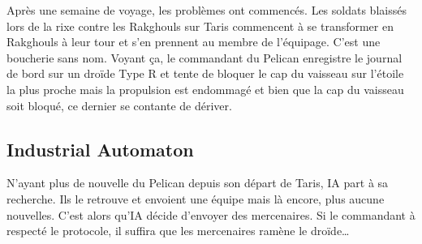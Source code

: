Après une semaine de voyage, les problèmes ont commencés. Les soldats blaissés lors de la rixe contre les Rakghouls sur Taris commencent à se transformer en Rakghouls à leur tour et s'en prennent au membre de l'équipage. C'est une boucherie sans nom. Voyant ça, le commandant du Pelican enregistre le journal de bord sur un droïde Type R et tente de bloquer le cap du vaisseau sur l'étoile la plus proche mais la propulsion est endommagé et bien que la cap du vaisseau soit bloqué, ce dernier se contante de dériver.

\subsection{Industrial Automaton}
N'ayant plus de nouvelle du Pelican depuis son départ de Taris, IA part à sa recherche. Ils le retrouve et envoient une équipe mais là encore, plus aucune nouvelles. C'est alors qu'IA décide d'envoyer des mercenaires. Si le commandant à respecté le protocole, il suffira que les mercenaires ramène le droïde\ldots

